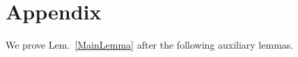 \documentclass[journal, twocolumn]{IEEEtran}
\begin{document}











\section{Appendix}\label{proofs}

We prove Lem.~\ref{MainLemma} after the following auxiliary lemmas.  %
\end{document}
